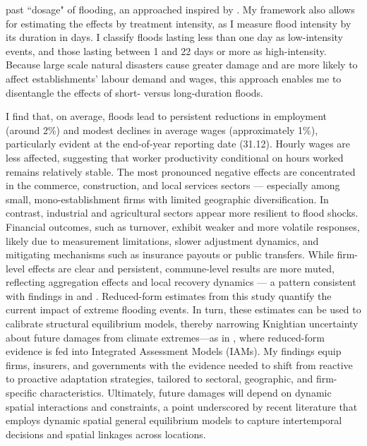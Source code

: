 past ``dosage" of flooding, an approached inspired by \cite{patel2023floods}. My framework also allows for estimating the effects by treatment intensity, as I measure flood intensity by its duration in days. I classify floods lasting less than one day as low-intensity events, and those lasting between 1 and 22 days or more as high-intensity. Because large scale natural disasters cause greater damage and are more likely to affect
establishments’ labour demand and wages, this approach enables me to disentangle the effects of short- versus long-duration floods. 

I find that, on average, floods lead to persistent reductions in employment (around 2\%) and modest declines in average wages (approximately 1\%), particularly evident at the end-of-year reporting date (31.12). Hourly wages are less affected, suggesting that worker productivity conditional on hours worked remains relatively stable. The most pronounced negative effects are concentrated in the commerce, construction, and local services sectors — especially among small, mono-establishment firms with limited geographic diversification. In contrast, industrial and agricultural sectors appear more resilient to flood shocks. Financial outcomes, such as turnover, exhibit weaker and more volatile responses, likely due to measurement limitations, slower adjustment dynamics, and mitigating mechanisms such as insurance payouts or public transfers. While firm-level effects are clear and persistent, commune-level results are more muted, reflecting aggregation effects and local recovery dynamics — a pattern consistent with findings in \cite{leiter2009creative} and \cite{usman2024going}. Reduced-form estimates from this study quantify the current impact of extreme flooding events. In turn, these estimates can be used to calibrate structural equilibrium models, thereby narrowing Knightian uncertainty about future damages from climate extremes—as in \cite{bilal2023anticipating}, where reduced-form evidence is fed into Integrated Assessment Models (IAMs). My findings equip firms, insurers, and governments with the evidence needed to shift from reactive to proactive adaptation strategies, tailored to sectoral, geographic, and firm-specific characteristics. Ultimately, future damages will depend on dynamic spatial interactions and constraints, a point underscored by recent literature \citep{balboni2025spatial} that employs dynamic spatial general equilibrium models to capture intertemporal decisions and spatial linkages across locations. \\


